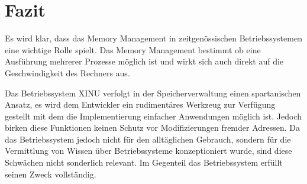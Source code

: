 \section{Fazit}
\label{sec:Fazit}
Es wird klar, dass das Memory Management in zeitgenössischen Betriebssystemen eine wichtige Rolle spielt. Das Memory Management bestimmt ob eine Ausführung mehrerer Prozesse möglich ist und wirkt sich auch direkt auf die Geschwindigkeit des Rechners aus. 

Das Betriebssystem XINU verfolgt in der Speicherverwaltung einen spartanischen Ansatz, es wird dem Entwickler ein rudimentäres Werkzeug zur Verfügung gestellt mit dem die Implementierung einfacher Anwendungen möglich ist. Jedoch birken diese Funktionen keinen Schutz vor Modifizierungen fremder Adressen. Da das Betriebssystem jedoch nicht für den alltäglichen Gebrauch, sondern für die Vermittlung von Wissen über Betriebssysteme konzeptioniert wurde, sind diese Schwächen nicht sonderlich relevant. Im Gegenteil das Betriebssystem erfüllt seinen Zweck vollständig.
